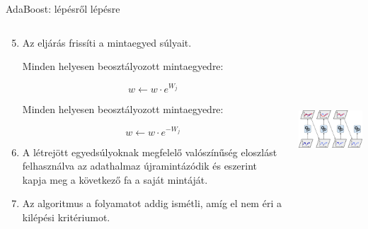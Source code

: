 \documentclass[english, aspectratio=169]{beamer}
\begin{document}
\begin{frame}{AdaBoost: lépésről lépésre}
\begin{columns}
\begin{column}{.6\textwidth}
\begin{enumerate}
	\setcounter{enumi}{4}
	\item Az eljárás frissíti a mintaegyed súlyait.\par\smallskip 
	Minden helyesen beosztályozott mintaegyedre:
	\begin{block}{}
	\vspace{-0.2cm}
	\[
	w \leftarrow w \cdot e^{W_j}
	\]
	\end{block}
	Minden helyesen beosztályozott mintaegyedre:
	\begin{block}{}
	\vspace{-0.2cm}
	\[
	w \leftarrow w \cdot e^{-W_j}
	\]
	\end{block}
	\item A létrejött egyedsúlyoknak megfelelő valószínűség eloszlást felhasználva az adathalmaz újramintázódik és eszerint kapja meg a következő fa a saját mintáját. 
	\item Az algoritmus a folyamatot addig ismétli, amíg el nem éri a kilépési kritériumot.
\end{enumerate}
\end{column}
\begin{column}{.4\textwidth}
\begin{center}
\includegraphics[width=6cm, height=7cm, keepaspectratio]{images/ensemble_7.png}
\end{center}
\end{column}
\end{columns}
\end{frame}
\end{document}
